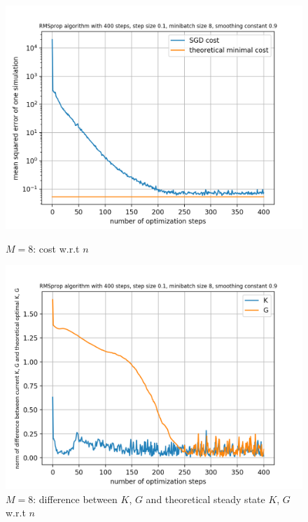 \documentclass{article}
\begin{document}
\begin{figure}[h!]
	\centering
	\begin{minipage}[t]{.28\paperwidth}
		\centering
		\includegraphics[width=1.0\textwidth]{Figures/M8.png}
		\caption{$M=8$: cost w.r.t $n$}
	\end{minipage}%
	\begin{minipage}[t]{.28\paperwidth}
		\centering
		\includegraphics[width=1.0\textwidth]{Figures/d_M8.png}
		\caption{$M=8$: difference between $K$, $G$ and theoretical steady state $K$, $G$ w.r.t $n$}
	\end{minipage}%
	\begin{minipage}[t]{.28\paperwidth}
		\centering

\end{minipage}
\end{figure}
\end{document}
